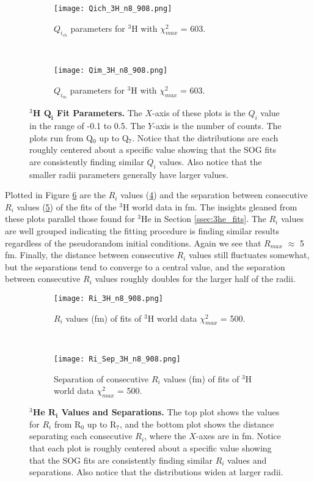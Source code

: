 \begin{figure}[!ht]
\begin{subfigure}{1.\textwidth}
  \centering
  \texttt{[image: Qich\_3H\_n8\_908.png]}
  \caption{$Q_{i_{ch}}$ parameters for $^3$H with $\chi^2_{max}$ = 603.}
  \label{fig:3h_qch}
\end{subfigure}\\
\begin{subfigure}{1.\textwidth}
  \centering
  \texttt{[image: Qim\_3H\_n8\_908.png]}
  \caption{$Q_{i_{m}}$ parameters for $^3$H with $\chi^2_{max}$ = 603.}
  \label{fig:3h_qm}
\end{subfigure}
\caption[$^3$H $Q_i$ Fit Parameters]{{\bf{$^3$H $\boldsymbol{Q_i}$ Fit Parameters.}} The $X$-axis of these plots is the $Q_i$ value in the range of -0.1 to 0.5. The $Y$-axis is the number of counts. The plots run from Q$_0$ up to Q$_7$. Notice that the distributions are each roughly centered about a specific value showing that the SOG fits are consistently finding similar $Q_i$ values. Also notice that the smaller radii parameters generally have larger values.}
\label{fig:3h_qi}
\end{figure}

Plotted in Figure \ref{fig:3h_ri} are the $R_i$ values (\ref{fig:3h_ri_ind}) and the separation between consecutive $R_i$ values (\ref{fig:3h_ri_sep}) of the fits of the $^3$H world data in fm. The insights gleaned from these plots parallel those found for $^3$He in Section \ref{ssec:3he_fits}. The $R_i$ values are well grouped indicating the fitting procedure is finding similar results regardless of the pseudorandom initial conditions. Again we see that  $R_{max}$ $\approx$ 5 fm. Finally, the distance between consecutive $R_i$ values still fluctuates somewhat, but the separations tend to converge to a central value, and the separation between consecutive $R_i$ values roughly doubles for the larger half of the radii.

\begin{figure}[!ht]
\begin{subfigure}{1.\textwidth}
  \centering
  \texttt{[image: Ri\_3H\_n8\_908.png]}
  \caption{$R_i$ values (fm) of fits of $^3$H world data $\chi^2_{max}$ = 500.}
  \label{fig:3h_ri_ind}
\end{subfigure}\\
\begin{subfigure}{1.\textwidth}
  \centering
  \texttt{[image: Ri\_Sep\_3H\_n8\_908.png]}
  \caption{Separation of consecutive $R_i$ values (fm) of fits of $^3$H world data $\chi^2_{max}$ = 500.}
  \label{fig:3h_ri_sep}
\end{subfigure}
\caption[$^3$He $R_i$ Values and Separations]{{\bf{$^3$He $\boldsymbol{R_i}$ Values and Separations.}} The top plot shows the values for $R_i$ from R$_0$ up to R$_7$, and the bottom plot shows the distance separating each consecutive $R_i$, where the $X$-axes are in fm. Notice that each plot is roughly centered about a specific value showing that the SOG fits are consistently finding similar $R_i$ values and separations. Also notice that the distributions widen at larger radii.}
\label{fig:3h_ri}
\end{figure}

